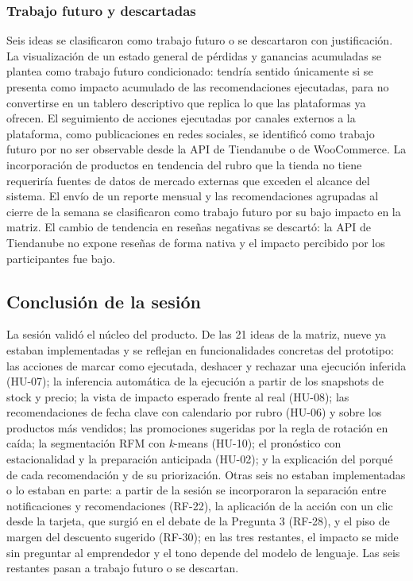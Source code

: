 \subsubsection{Trabajo futuro y descartadas}

Seis ideas se clasificaron como trabajo futuro o se descartaron con justificación. La visualización de un estado general de pérdidas y ganancias acumuladas se plantea como trabajo futuro condicionado: tendría sentido únicamente si se presenta como impacto acumulado de las recomendaciones ejecutadas, para no convertirse en un tablero descriptivo que replica lo que las plataformas ya ofrecen. El seguimiento de acciones ejecutadas por canales externos a la plataforma, como publicaciones en redes sociales, se identificó como trabajo futuro por no ser observable desde la API de Tiendanube o de WooCommerce. La incorporación de productos en tendencia del rubro que la tienda no tiene requeriría fuentes de datos de mercado externas que exceden el alcance del sistema. El envío de un reporte mensual y las recomendaciones agrupadas al cierre de la semana se clasificaron como trabajo futuro por su bajo impacto en la matriz. El cambio de tendencia en reseñas negativas se descartó: la API de Tiendanube no expone reseñas de forma nativa y el impacto percibido por los participantes fue bajo.

\subsection{Conclusión de la sesión}
\label{sec:brainstorming-conclusion}

La sesión validó el núcleo del producto. De las 21 ideas de la matriz, nueve ya estaban implementadas y se reflejan en funcionalidades concretas del prototipo: las acciones de marcar como ejecutada, deshacer y rechazar una ejecución inferida (HU-07); la inferencia automática de la ejecución a partir de los snapshots de stock y precio; la vista de impacto esperado frente al real (HU-08); las recomendaciones de fecha clave con calendario por rubro (HU-06) y sobre los productos más vendidos; las promociones sugeridas por la regla de rotación en caída; la segmentación RFM con \emph{k}-means (HU-10); el pronóstico con estacionalidad y la preparación anticipada (HU-02); y la explicación del porqué de cada recomendación y de su priorización.
Otras seis no estaban implementadas o lo estaban en parte: a partir de la sesión se incorporaron la separación entre notificaciones y recomendaciones (RF-22), la aplicación de la acción con un clic desde la tarjeta, que surgió en el debate de la Pregunta 3 (RF-28), y el piso de margen del descuento sugerido (RF-30); en las tres restantes, el impacto se mide sin preguntar al emprendedor y el tono depende del modelo de lenguaje. Las seis restantes pasan a trabajo futuro o se descartan.


